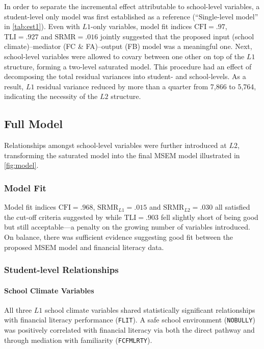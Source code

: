 In order to separate the incremental effect attributable to school-level variables, a student-level only model was first established as a reference (``Single-level model'' in \cref{tab:est1}). Even with $L1$-only variables, model fit indices $\text{CFI} = .97$, $\text{TLI} = .927$ and $\text{SRMR} = .016$ jointly suggested that the proposed input (school climate)--mediator (FC \& FA)--output (FB) model was a meaningful one. Next, school-level variables were allowed to covary between one other on top of the $L1$ structure, forming a two-level saturated model. This procedure had an effect of decomposing the total residual variances into student- and school-levels. As a result, $L1$ residual variance reduced by more than a quarter from 7,866 to 5,764, indicating the necessity of the $L2$ structure.

\subsection{Full Model}

Relationships amongst school-level variables were further introduced at $L2$, transforming the saturated model into the final MSEM model illustrated in \cref{fig:model}.

\subsubsection{Model Fit}

Model fit indices $\text{CFI} = .968$, $\text{SRMR}_{L1} = .015$ and $\text{SRMR}_{L2} =.030$ all satisfied the cut-off criteria suggested by \citet{hu:1999} while $\text{TLI} = .903$ fell slightly short of being good but still acceptable---a penalty on the growing number of variables introduced. On balance, there was sufficient evidence suggesting good fit between the proposed MSEM model and financial literacy data.

\subsubsection{Student-level Relationships}

\paragraph{School Climate Variables}

All three $L1$ school climate variables shared statistically significant relationships with financial literacy performance (\texttt{FLIT}). A safe school environment (\texttt{NOBULLY}) was positively correlated with financial literacy via both the direct pathway and through mediation with familiarity (\texttt{FCFMLRTY}).


